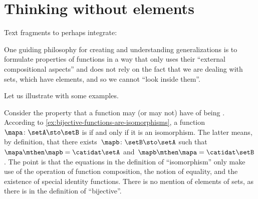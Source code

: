 
\section{Thinking without elements}
\label{sec:thinking-without-elements}


Text fragments to perhaps integrate: 


One guiding philosophy for creating and understanding generalizations is to formulate properties of functions in a way that only uses their ``external compositional aspects'' and does not rely on the fact that we are dealing with sets, which have elements, and so we cannot ``look inside them''.

Let us illustrate with some examples.

\begin{example}
    Consider the property that a function may (or may not) have of being .
    According to \cref{ex:bijective-functions-are-isomorphisms}, a function~$\mapa\colon \setA \sto \setB$ is  if and only if it is an isomorphism.
    The latter means, by definition, that there exists~$\mapb \colon \setB \sto \setA$ such that~$\mapa \mthen \mapb = \catidat\setA$ and~$\mapb \mthen \mapa = \catidat\setB$.
    The point is that the equations in the definition of ``isomorphism'' only make use of the operation of function composition, the notion of equality, and the existence of special identity functions.
    There is no mention of elements of sets, as there is in the definition of ``bijective''.
\end{example}

